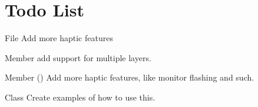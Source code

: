 \chapter{Todo List}
\hypertarget{todo}{}\label{todo}

\begin{DoxyRefList}
\item[File \doxylink{_common_8h}{Common.h} ]\label{todo__todo000001}%
%
Add more haptic features 
\item[Member \doxylink{class_techstorm_1_1abstract_a93214f9f4d74e58ff7ed49e089c68213}{Techstorm\+::abstract\texorpdfstring{$<$}{<} K, D, T \texorpdfstring{$>$}{>}\+::depth} ]\label{todo__todo000006}%
%
add support for multiple layers.  
\item[Member \doxylink{namespace_techstorm_acbc8f303afb42ae77958c4f0cc5601ba}{Techstorm\+::Init\+Haptics} ()]\label{todo__todo000002}%
%
Add more haptic features, like monitor flashing and such.  
\item[Class \doxylink{class_techstorm_1_1_input_registry}{Techstorm\+::Input\+Registry} ]\label{todo__todo000004}%
%
Create examples of how to use this. 
\end{DoxyRefList}